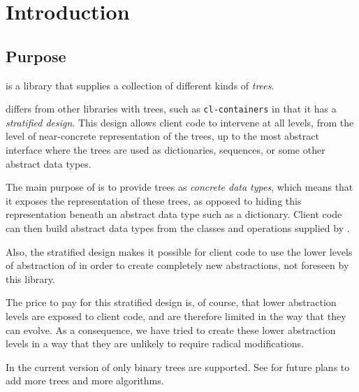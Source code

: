 \chapter{Introduction}
%

\section{Purpose}

\sysname{} is a library that supplies a collection of different kinds
of \emph{trees}.

\sysname{} differs from other libraries with trees, such as
\texttt{cl-containers} in that it has a \emph{stratified design}.
This design allows client code to intervene at all levels, from the
level of near-concrete representation of the trees, up to the most
abstract interface where the trees are used as dictionaries,
sequences, or some other abstract data types.

The main purpose of \sysname{} is to provide trees as \emph{concrete
  data types}, which means that it exposes the representation of these
trees, as opposed to hiding this representation beneath an abstract
data type such as a dictionary.  Client code can then build abstract
data types from the classes and operations supplied by \sysname{}.

Also, the stratified design makes it possible for client code to use
the lower levels of abstraction of \sysname{} in order to create
completely new abstractions, not foreseen by this library.

The price to pay for this stratified design is, of course, that lower
abstraction levels are exposed to client code, and are therefore
limited in the way that they can evolve.  As a consequence, we have
tried to create these lower abstraction levels in a way that they are
unlikely to require radical modifications.

In the current version of \sysname{} only binary trees are supported.
See  for future plans to add more trees and more
algorithms.
